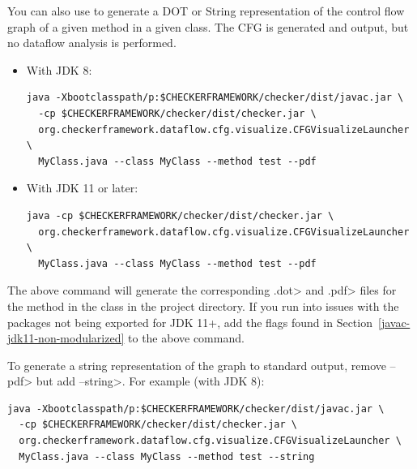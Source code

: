 \begin{itemize}
\end{itemize}



You can also use  to generate a DOT
or String representation of the control flow graph of a given method in a given class.
The CFG is generated and output, but no dataflow analysis is performed.

\begin{itemize}

\item With JDK 8:

\begin{smaller}
\begin{Verbatim}
java -Xbootclasspath/p:$CHECKERFRAMEWORK/checker/dist/javac.jar \
  -cp $CHECKERFRAMEWORK/checker/dist/checker.jar \
  org.checkerframework.dataflow.cfg.visualize.CFGVisualizeLauncher \
  MyClass.java --class MyClass --method test --pdf
\end{Verbatim}
\end{smaller}


\item With JDK 11 or later:

\begin{smaller}
\begin{Verbatim}
java -cp $CHECKERFRAMEWORK/checker/dist/checker.jar \
  org.checkerframework.dataflow.cfg.visualize.CFGVisualizeLauncher \
  MyClass.java --class MyClass --method test --pdf
\end{Verbatim}
\end{smaller}

\end{itemize}

\noindent
The above command will generate the corresponding \<.dot> and \<.pdf> files for the
method  in the class  in the project directory. If you run into
issues with the  packages not being exported for JDK 11+, add the  flags
found in Section~\ref{javac-jdk11-non-modularized} to the above command.

\noindent To generate a string representation of the graph to standard output,
remove \<--pdf> but add \<--string>. For example (with JDK 8):

\begin{smaller}
\begin{Verbatim}
java -Xbootclasspath/p:$CHECKERFRAMEWORK/checker/dist/javac.jar \
  -cp $CHECKERFRAMEWORK/checker/dist/checker.jar \
  org.checkerframework.dataflow.cfg.visualize.CFGVisualizeLauncher \
  MyClass.java --class MyClass --method test --string
\end{Verbatim}
\end{smaller}

